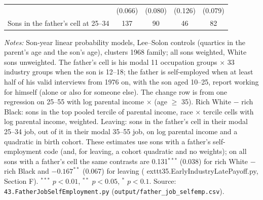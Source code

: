 \begin{table}[!htbp]
{{\begin{tabular}{lcccc}
 & (0.066) & (0.080) & (0.126) & (0.079) \\
Sons in the father's cell at 25--34 & 137 & 90 & 46 & 82 \\
\bottomrule
\end{tabular}}}
\par\smallskip
\begin{minipage}{\textwidth}\footnotesize \textit{Notes:} Son-year linear probability models, Lee--Solon controls (quartics in the parent's age and the son's age), clusters 1968 family; all sons weighted, White sons unweighted. The father's cell is his modal 11 occupation groups $\times$ 33 industry groups when the son is 12--18; the father is self-employed when at least half of his valid interviews from 1976 on, with the son aged 10--25, report working for himself (alone or also for someone else). The change row is from one regression on 25--55 with log parental income $\times$ (age $\geq$ 35). Rich White $-$ rich Black: sons in the top pooled tercile of parental income, race $\times$ tercile cells with log parental income, weighted. Leaving: sons in the father's cell in their modal 25--34 job, out of it in their modal 35--55 job, on log parental income and a quadratic in birth cohort. These estimates use sons with a father's self-employment code (and, for leaving, a cohort quadratic and no weights); on all sons with a father's cell the same contrasts are 0.131$^{***}$ (0.038) for rich White $-$ rich Black and $-0.167^{**}$ (0.067) for leaving (	exttt{35.EarlyIndustryLatePayoff.py}, Section F). $^{***}$ $p<0.01$, $^{**}$ $p<0.05$, $^{*}$ $p<0.1$. Source: \texttt{43.FatherJobSelfEmployment.py} (\texttt{output/father\_job\_selfemp.csv}).\end{minipage}
\end{table}
